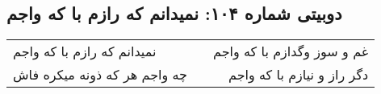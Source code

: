 \begin{center}
\section*{دوبیتی شماره ۱۰۴: نمیدانم که رازم با که واجم}
\label{sec:104}
\begin{longtable}{l p{0.5cm} r}
نمیدانم که رازم با که واجم
&&
غم و سوز وگدازم با که واجم
\\
چه واجم هر که ذونه میکره فاش
&&
دگر راز و نیازم با که واجم
\\
\end{longtable}
\end{center}
